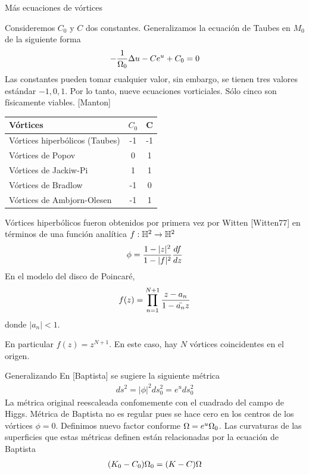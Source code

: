 \documentclass[11pt,t]{beamer}
\begin{document}
\begin{frame}{Más ecuaciones de vórtices}

Consideremos $C_0$ y $C$ dos constantes. Generalizamos la ecuación de Taubes en $M_0$ de la siguiente forma
\begin{align}
-\frac{1}{\Omega_0}\Delta u-Ce^u+C_0 =0
\end{align}
Las constantes pueden tomar cualquier valor, sin embargo, se tienen tres valores estándar $-1,0,1$. Por lo tanto, nueve ecuaciones vorticiales. Sólo cinco son físicamente viables. [Manton]

\begin{table}[ht]
    \centering
    \begin{tabular}{l|c|c}
        Vórtices & $C_0$ & C \\ \hline
        Vórtices hiperbólicos (Taubes) & -1 & -1\\
        Vórtices de Popov & 0 & 1\\
        Vórtices de Jackiw-Pi & 1 & 1\\
        Vórtices de Bradlow & -1 & 0\\
        Vórtices de Ambjorn-Olesen & -1 & 1\\ \hline
    \end{tabular}
    \label{tab:vortex}
\end{table}

\end{frame}

\begin{frame}

Vórtices hiperbólicos fueron obtenidos por primera vez por Witten [Witten77] en términos de una función analítica $f:\mathbb{H}^2\rightarrow\mathbb{H}^2$
\begin{align}
\phi = \frac{1-|z|^2}{1-|f|^2}\frac{df}{dz}
\end{align}
En el modelo del disco de Poincaré,
\begin{align}
f(z) = \prod_{n=1}^{N+1}\frac{z-a_n}{1-\bar{a_n}z}
\end{align}
donde $|a_n|<1$.

En particular $f(z)=z^{N+1}$. En este caso, hay $N$ vórtices coincidentes en el origen.

\end{frame}

\begin{frame}{Generalizando }
En [Baptista]\cite{baptista_vortices_2013} se sugiere la siguiente métrica
\begin{align}
ds^2 = |\phi|^2 ds_0^2 = e^{u}ds_0^2
\end{align}  
La métrica original reescaleada confomemente con el cuadrado del campo de Higgs. Métrica de Baptista no es regular pues se hace cero en los centros de los vórtices $\phi=0$. Definimos nuevo factor conforme $\Omega=e^u\Omega_0$. Las curvaturas de las superficies que estas métricas definen están relacionadas por la ecuación de Baptista
\begin{align}
(K_0-C_0)\Omega_0=(K-C)\Omega
\end{align}

\end{frame}
\end{document}

